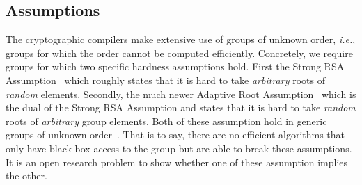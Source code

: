 
\subsection{Assumptions}

The cryptographic compilers make extensive use of groups of unknown order, \emph{i.e.}, groups for which the order cannot be computed efficiently.
Concretely, we require groups for which two specific hardness assumptions hold.
First the Strong RSA Assumption~\cite{EC:BarPfi97} which roughly states that it is hard to take \emph{arbitrary} roots of \emph{random} elements. Secondly, the much newer Adaptive Root Assumption~\cite{EC:Wesolowski19} which is the dual of the Strong RSA Assumption and states that it is hard to take \emph{random} roots of \emph{arbitrary} group elements. 
Both of these assumption hold in generic groups of unknown order~\cite{EC:DamKop02,C:BonBunFis19}. That is to say, there are no efficient algorithms that only have black-box access to the group but are able to break these assumptions. 
It is an open research problem to show whether one of these assumption implies the other.

